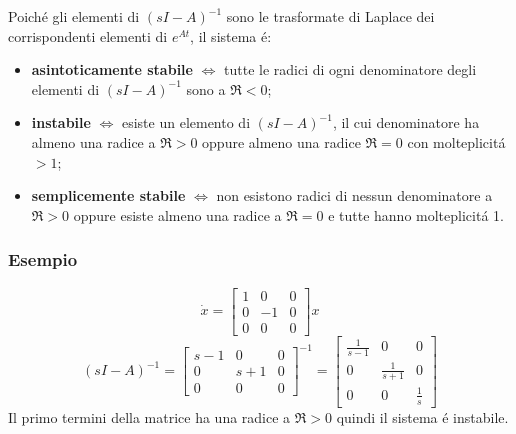 \documentclass[../main.tex]{subfiles}
\begin{document}
		Poich\'e gli elementi di $ (sI-A)^{-1} $ sono le trasformate di Laplace dei corrispondenti elementi di $ e^{At} $, il sistema \'e:
		\begin{itemize}
			\item
				\textbf{asintoticamente stabile} $ \Leftrightarrow $ tutte le radici di ogni denominatore degli elementi di $ (sI-A)^{-1} $ sono a $ \Re < 0 $;
			\item
				\textbf{instabile} $ \Leftrightarrow $ esiste un elemento di $ (sI-A)^{-1} $, il cui denominatore ha almeno una radice a $ \Re > 0 $ oppure almeno una radice $ \Re = 0 $ con molteplicit\'a $ > 1 $;
			\item
				\textbf{semplicemente stabile} $ \Leftrightarrow $ non esistono radici di nessun denominatore a $ \Re > 0 $ oppure esiste almeno una radice a $ \Re = 0 $ e tutte hanno molteplicit\'a 1.
		\end{itemize}
	
	\subsubsection*{Esempio}
		\[ \dot x =
			\begin{bmatrix}
				1 & 0 & 0\\
				0 & -1 & 0\\
				0 & 0 & 0
			\end{bmatrix} x
		\]
		\[ (sI-A)^{-1} =
			\begin{bmatrix}
				s-1 & 0 & 0\\
				0 & s+1 & 0\\
				0 & 0 & 0
			\end{bmatrix}^{-1} =
			\begin{bmatrix}
				\frac{1}{s-1} & 0 & 0\\
				0 & \frac{1}{s+1} & 0\\
				0 & 0 & \frac{1}{s}
			\end{bmatrix}
		\]
		Il primo termini della matrice ha una radice a $ \Re > 0 $ quindi il sistema \'e instabile.
		
\end{document}
